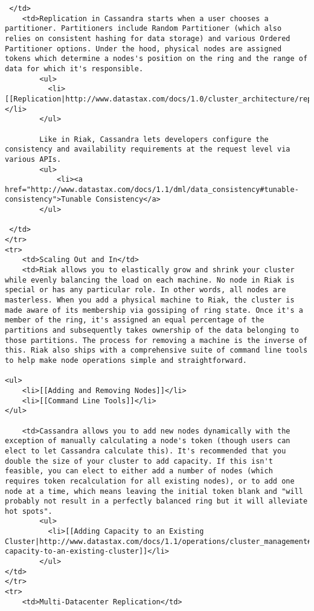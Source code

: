 \documentclass[letter]{book}
\begin{document}
\begin{shaded}
\begin{verbatim}
 </td>
    <td>Replication in Cassandra starts when a user chooses a partitioner. Partitioners include Random Partitioner (which also relies on consistent hashing for data storage) and various Ordered Partitioner options. Under the hood, physical nodes are assigned tokens which determine a nodes's position on the ring and the range of data for which it's responsible.
        <ul>
          <li>[[Replication|http://www.datastax.com/docs/1.0/cluster_architecture/replication]]</li>
        </ul>

        Like in Riak, Cassandra lets developers configure the consistency and availability requirements at the request level via various APIs.
        <ul>
            <li><a href="http://www.datastax.com/docs/1.1/dml/data_consistency#tunable-consistency">Tunable Consistency</a>
        </ul>

 </td>
</tr>
<tr>
    <td>Scaling Out and In</td>
    <td>Riak allows you to elastically grow and shrink your cluster while evenly balancing the load on each machine. No node in Riak is special or has any particular role. In other words, all nodes are masterless. When you add a physical machine to Riak, the cluster is made aware of its membership via gossiping of ring state. Once it's a member of the ring, it's assigned an equal percentage of the partitions and subsequently takes ownership of the data belonging to those partitions. The process for removing a machine is the inverse of this. Riak also ships with a comprehensive suite of command line tools to help make node operations simple and straightforward.

<ul>
    <li>[[Adding and Removing Nodes]]</li>
    <li>[[Command Line Tools]]</li>
</ul>

    <td>Cassandra allows you to add new nodes dynamically with the exception of manually calculating a node's token (though users can elect to let Cassandra calculate this). It's recommended that you double the size of your cluster to add capacity. If this isn't feasible, you can elect to either add a number of nodes (which requires token recalculation for all existing nodes), or to add one node at a time, which means leaving the initial token blank and "will probably not result in a perfectly balanced ring but it will alleviate hot spots".
        <ul>
          <li>[[Adding Capacity to an Existing Cluster|http://www.datastax.com/docs/1.1/operations/cluster_management#adding-capacity-to-an-existing-cluster]]</li>
        </ul>
</td>
</tr>
<tr>
    <td>Multi-Datacenter Replication</td>


\end{verbatim}
\end{shaded}
\end{document}
